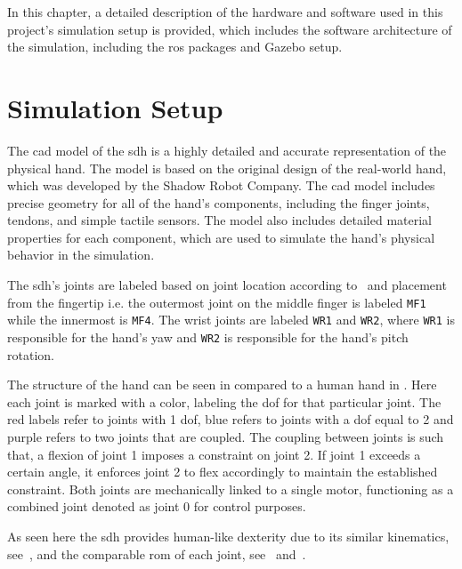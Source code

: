 In this chapter, a detailed description of the hardware and software used in this project's simulation setup is provided, which includes the software architecture of the simulation, including the \gls{ros} packages and Gazebo setup.

\section{Simulation Setup}\label{sec:system-setup-simulation-setup}

The \gls{cad} model of the \gls{sdh} is a highly detailed and accurate representation of the physical hand. The model is based on the original design of the real-world hand, which was developed by the Shadow Robot Company. The \gls{cad} model includes precise geometry for all of the hand's components, including the finger joints, tendons, and simple tactile sensors. The model also includes detailed material properties for each component, which are used to simulate the hand's physical behavior in the simulation.\medskip

The \gls{sdh}'s joints are labeled based on joint location according to~ and placement from the fingertip i.e. the outermost joint on the middle finger is labeled \texttt{MF1} while the innermost is \texttt{MF4}. The wrist joints are labeled \texttt{WR1} and \texttt{WR2}, where \texttt{WR1} is responsible for the hand's yaw and \texttt{WR2} is responsible for the hand's pitch rotation. \medskip

The structure of the hand can be seen in  compared to a human hand in . Here each joint is marked with a color, labeling the \gls{dof} for that particular joint. The red labels refer to joints with \num{1} \gls{dof}, blue refers to joints with a \gls{dof} equal to \num{2} and purple refers to two joints that are coupled. The coupling between joints is such that, a flexion of joint \num{1} imposes a constraint on joint \num{2}. If joint \num{1} exceeds a certain angle, it enforces joint \num{2} to flex accordingly to maintain the established constraint. Both joints are mechanically linked to a single motor, functioning as a combined joint denoted as joint \num{0} for control purposes. \medskip

As seen here the \gls{sdh} provides human-like dexterity due to its similar kinematics, see~, and the comparable \gls{rom} of each joint, see~ and~. \medskip

